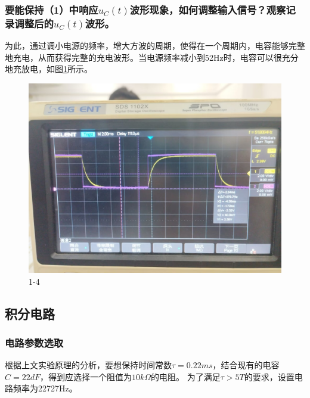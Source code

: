 \documentclass{ctexart}
\begin{document}
\subsubsection{要能保持（1）中响应$u_C(t)$波形现象，如何调整输入信号？观察记录调整后的$u_C(t)$波形。}
为此，通过调小电源的频率，增大方波的周期，使得在一个周期内，电容能够完整地充电，从而获得完整的充电波形。当电源频率减小到52Hz时，电容可以很充分地充放电，如图\ref{fig:1-4}所示。
\begin{figure}
    \centering
    \includegraphics[scale=0.2]{pic/1_4.jpg}
    \caption{1-4}
    \label{fig:1-4}
\end{figure}

\subsection{积分电路}
\subsubsection{电路参数选取}
根据上文实验原理的分析，要想保持时间常数$\tau=0.22ms$，结合现有的电容$C=22dF$，得到应选择一个阻值为$10k\Omega$的电阻。
为了满足$\tau > 5T$的要求，设置电路频率为22727Hz。
\end{document}
